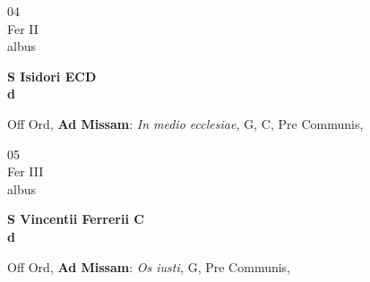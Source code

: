 \documentclass[10pt, openany]{book}
\begin{document}
        \begin{center}
            \begin{minipage}{3.5in}
                \vspace{2em}
                \begin{minipage}{0.5in}
                    {\Huge 04} \\
                    {\normalsize Fer II} \\
                    {\normalsize albus}
                \end{minipage}
                \begin{minipage}{3.0in}
                    \textbf{ \large S Isidori ECD \\
                    \textnormal{\normalsize d}} \\ 
                \end{minipage}
                \begin{justify}Off Ord, \textbf{Ad Missam}: \textit{In medio ecclesiae,} G, C, Pre Communis,  
                \end{justify}
            \end{minipage}
        \end{center}
    
        \begin{center}
            \begin{minipage}{3.5in}
                \vspace{2em}
                \begin{minipage}{0.5in}
                    {\Huge 05} \\
                    {\normalsize Fer III} \\
                    {\normalsize albus}
                \end{minipage}
                \begin{minipage}{3.0in}
                    \textbf{ \large S Vincentii Ferrerii C \\
                    \textnormal{\normalsize d}} \\ 
                \end{minipage}
                \begin{justify}Off Ord, \textbf{Ad Missam}: \textit{Os iusti,} G, Pre Communis,  
                \end{justify}
            \end{minipage}
        \end{center}
    
\end{document}
